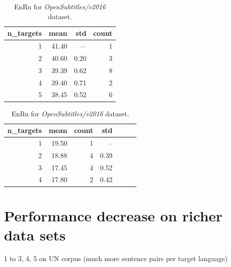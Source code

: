 \begin{table}[h!]
\begin{subtable}[t]{0.45\linewidth}
	\centering
	\begin{tabular}{rrrr}
	\toprule
	n\_targets &   mean &   std & count \\
	\midrule
	         1 &  41.40 &  ---  &   1 \\
	         2 &  40.60 &  0.20 &   3 \\
	         3 &  39.39 &  0.62 &   8 \\
	         4 &  39.40 &  0.71 &   2 \\
	         5 &  38.45 &  0.52 &   6 \\
	\bottomrule
	\end{tabular}

	\caption{
		En\to{}Bg for \emph{Europarl/v7} dataset.
		}
	\label{tab:bg/Europarl/v7}
\end{subtable}
\begin{subtable}[t]{0.45\linewidth}
	\centering
	\begin{tabular}{rrrrrrr}
	\toprule
	n\_targets & mean & count & std \\
	\midrule
	        1 &     19.50 &    1 &   --  \\
	        2 &     18.88 &    4 &  0.39 \\
	        3 &     17.45 &    4 &  0.52 \\
	        4 &     17.80 &    2 &  0.42 \\
	\bottomrule
	\end{tabular}
	
	\caption{
		En\to{}Ru for \emph{OpenSubtitles/v2016} dataset.
		}
	\label{ table:ru/OpenSubtitles/v2016 }
\end{subtable}
\end{table}



% 

\section{Performance decrease on richer data sets}
1 to 3, 4, 5 on UN corpus (much more sentence pairs per target language)
\cite{eisele-chen-2010-multiun}


